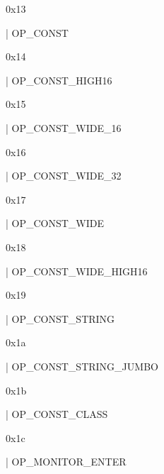 \documentclass[11pt]{article}
\begin{document}
\begin{ocamldoccomment}
0x13
\end{ocamldoccomment}
\begin{ocamldoccode}
  | OP_CONST
\end{ocamldoccode}
\begin{ocamldoccomment}
0x14
\end{ocamldoccomment}
\begin{ocamldoccode}
  | OP_CONST_HIGH16
\end{ocamldoccode}
\begin{ocamldoccomment}
0x15
\end{ocamldoccomment}
\begin{ocamldoccode}
  | OP_CONST_WIDE_16
\end{ocamldoccode}
\begin{ocamldoccomment}
0x16
\end{ocamldoccomment}
\begin{ocamldoccode}
  | OP_CONST_WIDE_32
\end{ocamldoccode}
\begin{ocamldoccomment}
0x17
\end{ocamldoccomment}
\begin{ocamldoccode}
  | OP_CONST_WIDE
\end{ocamldoccode}
\begin{ocamldoccomment}
0x18
\end{ocamldoccomment}
\begin{ocamldoccode}
  | OP_CONST_WIDE_HIGH16
\end{ocamldoccode}
\begin{ocamldoccomment}
0x19
\end{ocamldoccomment}
\begin{ocamldoccode}
  | OP_CONST_STRING
\end{ocamldoccode}
\begin{ocamldoccomment}
0x1a
\end{ocamldoccomment}
\begin{ocamldoccode}
  | OP_CONST_STRING_JUMBO
\end{ocamldoccode}
\begin{ocamldoccomment}
0x1b
\end{ocamldoccomment}
\begin{ocamldoccode}
  | OP_CONST_CLASS
\end{ocamldoccode}
\begin{ocamldoccomment}
0x1c
\end{ocamldoccomment}
\begin{ocamldoccode}
  | OP_MONITOR_ENTER
\end{ocamldoccode}
\end{document}
